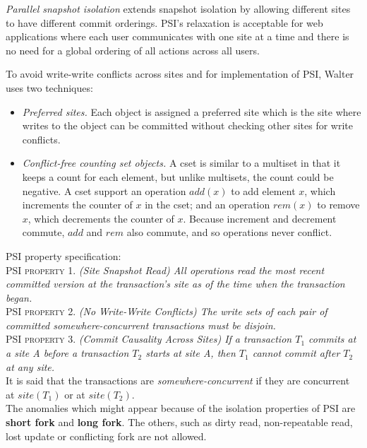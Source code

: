 \documentclass[a4paper]{article}
\begin{document}
\textit{Parallel snapshot isolation} extends snapshot isolation by allowing different sites to have different commit orderings. PSI's relaxation is acceptable for web applications where each user communicates with one site at a time and there is no need for a global ordering of all actions across all users. 

To avoid write-write conflicts across sites and for implementation of PSI, Walter uses two techniques:
\begin{itemize}
\item \textit{Preferred sites.} Each object is assigned a preferred site which is the site where writes to the object can be committed without checking other sites for write conflicts.
\item \textit{Conflict-free counting set objects.} A cset is similar to a multiset in that it keeps a count for each element, but unlike multisets, the count could be negative. A cset support an operation $add(x)$ to add element $x$, which increments the counter of $x$ in the cset; and an operation $rem(x)$ to remove $x$, which decrements the counter of $x$. Because increment and decrement commute, $add$ and $rem$ also commute, and so operations never conflict. 
\end{itemize}

PSI property specification:\\

PSI \textsc{property} 1. \textit{(Site Snapshot Read) All operations read the most recent committed version at the transaction's site as of the time when the transaction began.}\\

PSI \textsc{property} 2. \textit{(No Write-Write Conflicts) The write sets of each pair of committed somewhere-concurrent transactions must be disjoin.}\\

PSI \textsc{property} 3. \textit{(Commit Causality Across Sites) If a transaction $T_{1}$ commits at a site A before a transaction $T_{2}$ starts at site A, then $T_{1}$ cannot commit after $T_{2}$ at any site.}\\

It is said that the transactions are \textit{somewhere-concurrent} if they are concurrent at $site(T_{1})$ or at $site(T_{2})$.
\\
The anomalies which might appear because of the isolation properties of PSI are \textbf{short fork} and \textbf{long fork}. The others, such as dirty read, non-repeatable read, lost update or conflicting fork are not allowed. 
\end{document}
